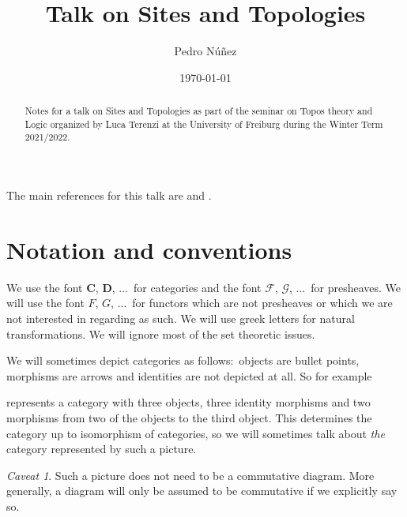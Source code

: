 \documentclass[12pt,a4paper]{amsart}
\title[Talk on Sites and Topologies]{Talk on Sites and Topologies}
\author[Pedro N\'{u}\~{n}ez]{Pedro N\'{u}\~{n}ez}
\date{\today}
\theoremstyle{plain}
\theoremstyle{definition}
\theoremstyle{remark}
\newtheorem{cav}{Caveat}
\begin{document}
\maketitle

\begin{abstract}
  Notes for a talk on Sites and Topologies as part of the seminar on Topos theory and Logic organized by Luca Terenzi at the University of Freiburg during the Winter Term 2021/2022.
\end{abstract}

\tableofcontents


The main references for this talk are \cite{sga4} and \cite{stacks-project}.

\setcounter{section}{-1}

\section{Notation and conventions}

We use the font $\mathbf{C}$, $\mathbf{D}$, ...~for categories and the font $\mathscr{F}$, $\mathscr{G}$, ...~for presheaves.
We will use the font $F$, $G$, ...~for functors which are not presheaves or which we are not interested in regarding as such.
We will use greek letters for natural transformations.
We will ignore most of the set theoretic issues.

We will sometimes depict categories as follows:~objects are bullet points, morphisms are arrows and identities are not depicted at all.
So for example
\begin{center}
\end{center}
represents a category with three objects, three identity morphisms and two morphisms from two of the objects to the third object.
This determines the category up to isomorphism of categories, so we will sometimes talk about \textit{the} category represented by such a picture.

\begin{cav}
  Such a picture does not need to be a commutative diagram.
  More generally, a diagram will only be assumed to be commutative if we explicitly say so.
\end{cav}
\end{document}

